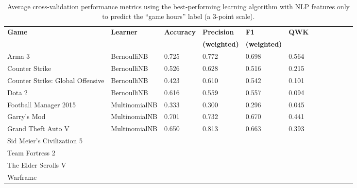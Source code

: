 \documentclass[9pt]{article}
\begin{document}
\begin{table*}[htbp]
\label{tab:gamehours_nlp_features}
\centering
\begin{tabular}{*{12}{l}}
\hline \bf Game & \bf Learner & \bf Accuracy & \bf Precision & \bf F1 & \bf QWK \\
& & & \bf (weighted) & \bf (weighted) & \\ \hline
Arma 3 & BernoulliNB & 0.725 & 0.772 & 0.698 & 0.564 \\
Counter Strike & BernoulliNB & 0.526 & 0.628 & 0.516 & 0.215 \\
Counter Strike: Global Offensive & BernoulliNB & 0.423 & 0.610 & 0.542 & 0.101 \\
Dota 2 & BernoulliNB & 0.616 & 0.559 & 0.557 & 0.094 \\
Football Manager 2015 & MultinomialNB & 0.333 & 0.300 & 0.296 & 0.045 \\
Garry's Mod & MultinomialNB & 0.701 & 0.732 & 0.670 & 0.441 \\
Grand Theft Auto V & MultinomialNB & 0.650 & 0.813 & 0.663 & 0.393 \\
Sid Meier's Civilization 5 & & & & & \\
Team Fortress 2 & & & & &  \\
The Elder Scrolls V & & & & & \\
Warframe & & & & & \\ \hline
\end{tabular}
\caption{Average cross-validation performance metrics using the best-performing learning algorithm with NLP features only to predict the ``game hours'' label (a 3-point scale).}
\end{table*}
\end{document}
